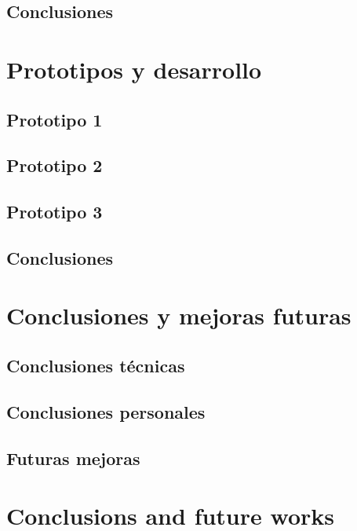 \documentclass[twoside, openright, 11pt]{report}
\begin{document}
\begin{enumerate}
  \section{Conclusiones}

\chapter{Prototipos y desarrollo}\label{cap.prototipos y desarrollo}
  \section{Prototipo 1}
  \section{Prototipo 2}
  \section{Prototipo 3}
  \section{Conclusiones}

\chapter{Conclusiones y mejoras futuras}\label{cap.conclusiones y mejoras futuras}
  \section{Conclusiones técnicas}
  \section{Conclusiones personales}
  \section{Futuras mejoras}

\chapter{Conclusions and future works}\label{cap.conclusions and future works}

\end{enumerate}
\end{document}

